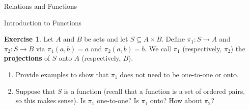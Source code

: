 \documentclass[11pt]{article}
\theoremstyle{definition}
\newtheorem{exercise}[theorem]{Exercise}
\begin{document}
\begin{section}{Relations and Functions}
\begin{subsection}{Introduction to Functions}
\begin{exercise}
Let $A$ and $B$ be sets and let $S\subseteq A\times B$.  Define $\pi_{1}:S\to A$ and $\pi_{2}:S\to B$ via $\pi_{1}(a,b)=a$ and $\pi_{2}(a,b)=b$.  We call $\pi_{1}$ (respectively, $\pi_{2}$) the \textbf{projections} of $S$ onto $A$ (respectively, $B$).
\begin{enumerate}
\item Provide examples to show that $\pi_{1}$ does not need to be one-to-one or onto.
\item Suppose that $S$ is a function (recall that a function is a set of ordered pairs, so this makes sense).  Is $\pi_{1}$ one-to-one? Is $\pi_{1}$ onto?  How about $\pi_{2}$?
\end{enumerate} 
\end{exercise}


\end{subsection}

\end{section}
\end{document}
